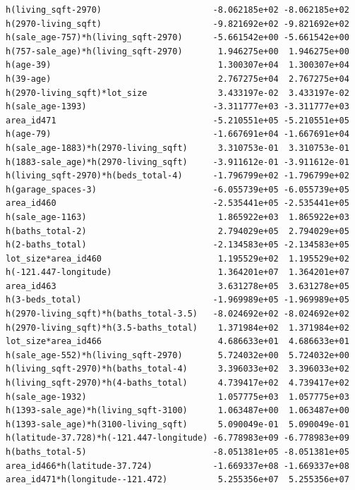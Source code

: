 \documentclass[
]{article}
\begin{document}
\begin{verbatim}
h(living_sqft-2970)                      -8.062185e+02 -8.062185e+02
h(2970-living_sqft)                      -9.821692e+02 -9.821692e+02
h(sale_age-757)*h(living_sqft-2970)      -5.661542e+00 -5.661542e+00
h(757-sale_age)*h(living_sqft-2970)       1.946275e+00  1.946275e+00
h(age-39)                                 1.300307e+04  1.300307e+04
h(39-age)                                 2.767275e+04  2.767275e+04
h(2970-living_sqft)*lot_size              3.433197e-02  3.433197e-02
h(sale_age-1393)                         -3.311777e+03 -3.311777e+03
area_id471                               -5.210551e+05 -5.210551e+05
h(age-79)                                -1.667691e+04 -1.667691e+04
h(sale_age-1883)*h(2970-living_sqft)      3.310753e-01  3.310753e-01
h(1883-sale_age)*h(2970-living_sqft)     -3.911612e-01 -3.911612e-01
h(living_sqft-2970)*h(beds_total-4)      -1.796799e+02 -1.796799e+02
h(garage_spaces-3)                       -6.055739e+05 -6.055739e+05
area_id460                               -2.535441e+05 -2.535441e+05
h(sale_age-1163)                          1.865922e+03  1.865922e+03
h(baths_total-2)                          2.794029e+05  2.794029e+05
h(2-baths_total)                         -2.134583e+05 -2.134583e+05
lot_size*area_id460                       1.195529e+02  1.195529e+02
h(-121.447-longitude)                     1.364201e+07  1.364201e+07
area_id463                                3.631278e+05  3.631278e+05
h(3-beds_total)                          -1.969989e+05 -1.969989e+05
h(2970-living_sqft)*h(baths_total-3.5)   -8.024692e+02 -8.024692e+02
h(2970-living_sqft)*h(3.5-baths_total)    1.371984e+02  1.371984e+02
lot_size*area_id466                       4.686633e+01  4.686633e+01
h(sale_age-552)*h(living_sqft-2970)       5.724032e+00  5.724032e+00
h(living_sqft-2970)*h(baths_total-4)      3.396033e+02  3.396033e+02
h(living_sqft-2970)*h(4-baths_total)      4.739417e+02  4.739417e+02
h(sale_age-1932)                          1.057775e+03  1.057775e+03
h(1393-sale_age)*h(living_sqft-3100)      1.063487e+00  1.063487e+00
h(1393-sale_age)*h(3100-living_sqft)      5.090049e-01  5.090049e-01
h(latitude-37.728)*h(-121.447-longitude) -6.778983e+09 -6.778983e+09
h(baths_total-5)                         -8.051381e+05 -8.051381e+05
area_id466*h(latitude-37.724)            -1.669337e+08 -1.669337e+08
area_id471*h(longitude--121.472)          5.255356e+07  5.255356e+07
                                                      

\end{verbatim}
\end{document}
